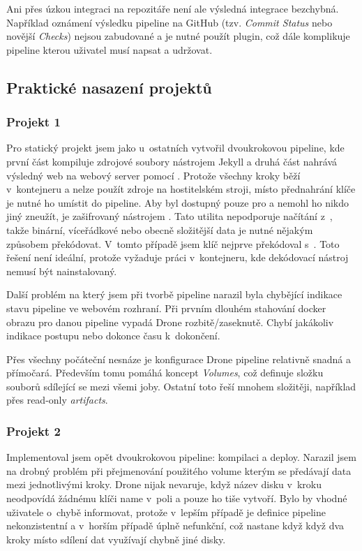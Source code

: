        Ani přes úzkou integraci na repozitáře není ale výsledná integrace bezchybná. Například oznámení výsledku pipeline na GitHub (tzv. \textit{Commit Status} nebo novější \textit{Checks}) nejsou zabudované a je nutné použít plugin, což dále komplikuje pipeline kterou uživatel musí napsat a udržovat.


    \subsection{Praktické nasazení projektů}
        \subsubsection{Projekt 1}
            Pro statický projekt jsem jako u~ostatních \CI vytvořil dvoukrokovou pipeline, kde první část kompiluje zdrojové soubory nástrojem Jekyll a druhá část nahrává výsledný web na webový server pomocí . Protože všechny kroky běží v~kontejneru a nelze použít zdroje na hostitelském stroji, místo přednahrání  klíče je nutné ho umístit do pipeline. Aby byl dostupný pouze pro \CI a nemohl ho nikdo jiný zneužít, je zašifrovaný  nástrojem . Tato utilita nepodporuje načítání z~, takže binární, víceřádkové nebo obecně složitější data je nutné nějakým způsobem překódovat. V~tomto případě jsem klíč nejprve překódoval s~. Toto řešení není ideální, protože vyžaduje práci v~kontejneru, kde dekódovací nástroj nemusí být nainstalovaný.

            Další problém na který jsem při tvorbě pipeline narazil byla chybějící indikace stavu pipeline ve webovém rozhraní. Při prvním dlouhém stahování docker obrazu pro danou pipeline vypadá Drone rozbitě/zaseknutě. Chybí jakákoliv indikace postupu nebo dokonce času k~dokončení.

            Přes všechny počáteční nesnáze je konfigurace Drone pipeline relativně snadná a přímočará. Především tomu pomáhá koncept \textit{Volumes}, což definuje složku souborů sdílející se mezi všemi joby. Ostatní \CI toto řeší mnohem složitěji, například přes read-only \textit{artifacts}.

        \subsubsection{Projekt 2}
            Implementoval jsem opět dvoukrokovou pipeline: kompilaci a deploy. Narazil jsem na drobný problém při přejmenování použitého volume kterým se předávají data mezi jednotlivými kroky. Drone nijak nevaruje, když název disku v~kroku neodpovídá žádnému klíči name v~poli  a pouze ho tiše vytvoří. Bylo by vhodné uživatele o~chybě informovat, protože v~lepším případě je definice pipeline nekonzistentní a v~horším případě úplně nefunkční, což nastane když když dva kroky místo sdílení dat využívají chybně jiné disky.

